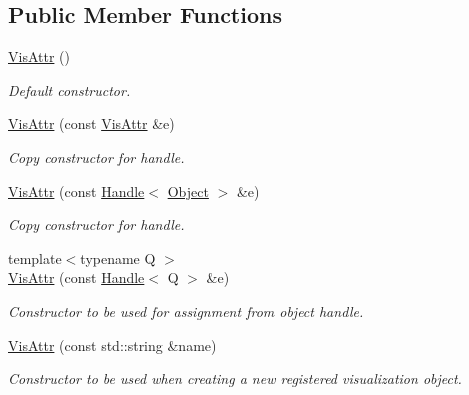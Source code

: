 \subsection*{Public Member Functions}
\begin{DoxyCompactItemize}
\item 
\hyperlink{class_d_d4hep_1_1_geometry_1_1_vis_attr_acfba4fd373c7595e64e5a88069646d09}{VisAttr} ()
\begin{DoxyCompactList}\small\item\em Default constructor. \item\end{DoxyCompactList}\item 
\hyperlink{class_d_d4hep_1_1_geometry_1_1_vis_attr_ab2085f9fc993fb7e83b4ba3430e6216e}{VisAttr} (const \hyperlink{class_d_d4hep_1_1_geometry_1_1_vis_attr}{VisAttr} \&e)
\begin{DoxyCompactList}\small\item\em Copy constructor for handle. \item\end{DoxyCompactList}\item 
\hyperlink{class_d_d4hep_1_1_geometry_1_1_vis_attr_a2e977728c8f627c4b5dea219d2353fda}{VisAttr} (const \hyperlink{class_d_d4hep_1_1_handle}{Handle}$<$ \hyperlink{class_d_d4hep_1_1_geometry_1_1_vis_attr_object}{Object} $>$ \&e)
\begin{DoxyCompactList}\small\item\em Copy constructor for handle. \item\end{DoxyCompactList}\item 
{\footnotesize template$<$typename Q $>$ }\\\hyperlink{class_d_d4hep_1_1_geometry_1_1_vis_attr_a5d9efb08d4afcfc0bab1392ba1135136}{VisAttr} (const \hyperlink{class_d_d4hep_1_1_handle}{Handle}$<$ Q $>$ \&e)
\begin{DoxyCompactList}\small\item\em Constructor to be used for assignment from object handle. \item\end{DoxyCompactList}\item 
\hyperlink{class_d_d4hep_1_1_geometry_1_1_vis_attr_af26cd4dd56c035b1a956fc6da8ca9b04}{VisAttr} (const std::string \&name)
\begin{DoxyCompactList}\small\item\em Constructor to be used when creating a new registered visualization object. \item\end{DoxyCompactList}\item 

\end{DoxyCompactItemize}
